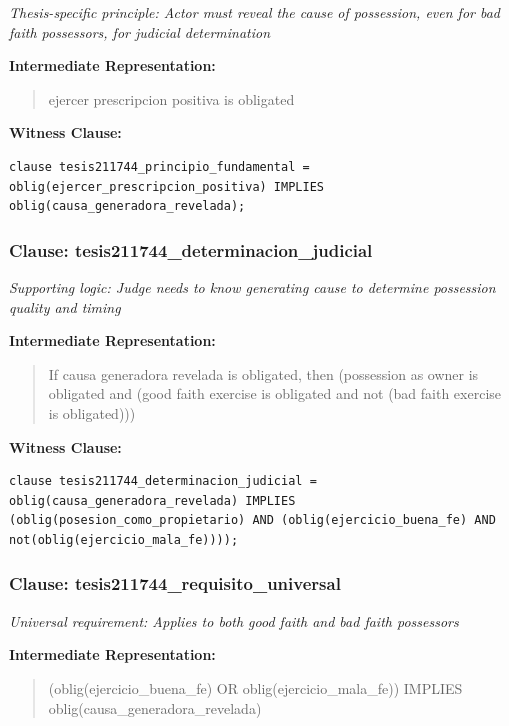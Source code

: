 \documentclass[11pt,a4paper]{article}
\begin{document}
\textit{Thesis-specific principle: Actor must reveal the cause of possession, even for bad faith possessors, for judicial determination}

\textbf{Intermediate Representation:}

\begin{quote}
ejercer prescripcion positiva is obligated
\end{quote}

\textbf{Witness Clause:}

\begin{lstlisting}[style=witnessstyle, language=Witness]
clause tesis211744_principio_fundamental = oblig(ejercer_prescripcion_positiva) IMPLIES oblig(causa_generadora_revelada);
\end{lstlisting}

\subsubsection{Clause: tesis211744\_determinacion\_judicial}

\textit{Supporting logic: Judge needs to know generating cause to determine possession quality and timing}

\textbf{Intermediate Representation:}

\begin{quote}
If causa generadora revelada is obligated, then (possession as owner is obligated and (good faith exercise is obligated and not (bad faith exercise is obligated)))
\end{quote}

\textbf{Witness Clause:}

\begin{lstlisting}[style=witnessstyle, language=Witness]
clause tesis211744_determinacion_judicial = oblig(causa_generadora_revelada) IMPLIES (oblig(posesion_como_propietario) AND (oblig(ejercicio_buena_fe) AND not(oblig(ejercicio_mala_fe))));
\end{lstlisting}

\subsubsection{Clause: tesis211744\_requisito\_universal}

\textit{Universal requirement: Applies to both good faith and bad faith possessors}

\textbf{Intermediate Representation:}

\begin{quote}
(oblig(ejercicio\_buena\_fe) OR oblig(ejercicio\_mala\_fe)) IMPLIES oblig(causa\_generadora\_revelada)
\end{quote}
\end{document}
